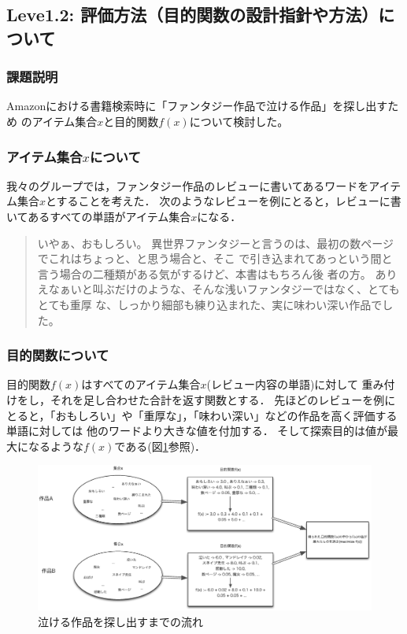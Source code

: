 \subsection{Leve1.2: 評価方法（目的関数の設計指針や方法）について}
\subsubsection{課題説明}
Amazonにおける書籍検索時に「ファンタジー作品で泣ける作品」を探し出すため
のアイテム集合$x$と目的関数$f(x)$について検討した。


\subsubsection{アイテム集合$x$について}

我々のグループでは，ファンタジー作品のレビューに書いてあるワードをアイテム集合$x$とすることを考えた．
次のようなレビューを例にとると，レビューに書いてあるすべての単語がアイテム集合$x$になる．
\begin{quote}
いやぁ、おもしろい。
異世界ファンタジーと言うのは、最初の数ページでこれはちょっと、と思う場合と、そこ
で引き込まれてあっという間と言う場合の二種類がある気がするけど、本書はもちろん後
者の方。
ありえなぁいと叫ぶだけのような、そんな浅いファンタジーではなく、とてもとても重厚
な、しっかり細部も練り込まれた、実に味わい深い作品でした。
\end{quote}

\subsubsection{目的関数について}
目的関数$f(x)$はすべてのアイテム集合$x$(レビュー内容の単語)に対して
重み付けをし，それを足し合わせた合計を返す関数とする．
先ほどのレビューを例にとると，「おもしろい」や「重厚な」，「味わい深い」などの作品を高く評価する単語に対しては
他のワードより大きな値を付加する．
そして探索目的は値が最大になるような$f(x)$である(図\ref{fig:level1-2}参照)．


\begin{figure}[h]
	\begin{center}
		\includegraphics[scale=0.35]{./figs/level1-2.eps}
	\end{center}
	\caption{泣ける作品を探し出すまでの流れ}
	\label{fig:level1-2}
\end{figure}

